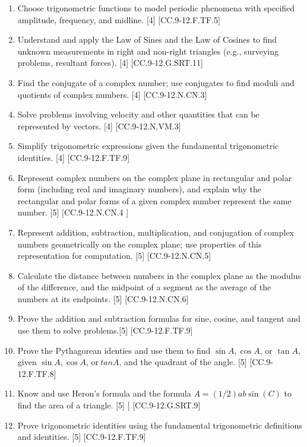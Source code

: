 \documentclass{article}
\begin{document}
\begin{enumerate}
	\item Choose trigonometric functions to model periodic phenomena with specified amplitude, frequency, and midline. [4] [CC.9-12.F.TF.5]
	\item Understand and apply the Law of Sines and the Law of Cosines to find unknown measurements in right and non-right triangles (e.g., surveying problems, resultant forces). [4] [CC.9-12.G.SRT.11]
	\item Find the conjugate of a complex number; use conjugates to find moduli and quotients of complex numbers. [4] [CC.9-12.N.CN.3]
	\item Solve problems involving velocity and other quantities that can be represented by vectors. [4] [CC.9-12.N.VM.3]
	\item Simplify trigonometric expressions given the fundamental trigonometric identities. [4]  [CC.9-12.F.TF.9]
	\item Represent complex numbers on the complex plane in rectangular and polar form (including real and imaginary numbers), and explain why the rectangular and polar forms of a given complex number represent the same number. [5] [CC.9-12.N.CN.4 ]
	\item Represent addition, subtraction, multiplication, and conjugation of complex numbers geometrically on the complex plane; use properties of this representation for computation. [5] [CC.9-12.N.CN.5]
	\item Calculate the distance between numbers in the complex plane as the modulus of the difference, and the midpoint of a segment as the average of the numbers at its endpoints. [5] [CC.9-12.N.CN.6]
	\item Prove the addition and subtraction formulas for sine, cosine, and tangent and use them to solve problems.[5] [CC.9-12.F.TF.9]
	\item Prove the Pythagorean identies and use them to find $\sin A, \cos A$, or $\tan A$, given $\sin A, \cos A$, or$\ tan A$, and the quadrant of the angle. [5] [CC.9-12.F.TF.8]
	\item Know and use Heron's formula and the formula $A = (1/2)ab \sin(C)$ to find the area of a triangle. [5] [ [CC.9-12.G.SRT.9]
	\item Prove trigonometric identities using the fundamental trigonometric definitions and identities. [5] [CC.9-12.F.TF.9]
\end{enumerate}
\newpage
\end{document}
